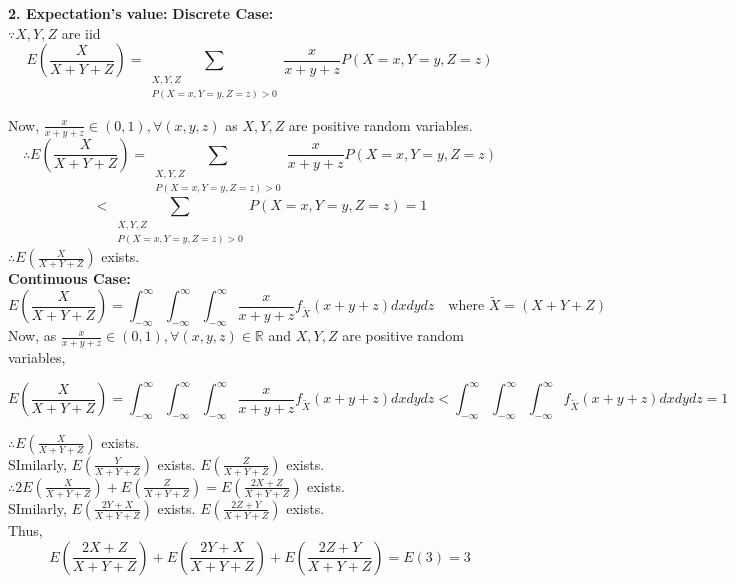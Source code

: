 \documentclass{article}
\theoremstyle{definition}
\begin{document}
\textbf{2. Expectation's value:}
\textbf{Discrete Case:\\
$\because X,Y,Z$}  are iid
\[
E\left( \frac{X}{X + Y + Z} \right) = \sum_{\substack{X,Y,Z \\ P(X=x, Y=y, Z=z)>0}} \frac{x}{x + y + z} P(X=x, Y=y, Z=z)

\]


Now, $\frac{x}{x + y + z} \in (0,1), \forall (x,y,z)$  as $X,Y, Z$ are positive random variables.
\[
\therefore E\left( \frac{X}{X + Y + Z} \right) = \sum_{\substack{X,Y,Z \\ P(X=x, Y=y, Z=z)>0}} \frac{x}{x + y + z} P(X=x, Y=y, Z=z)
\]
\[
< \sum_{\substack{X,Y,Z \\ P(X=x, Y=y, Z=z)>0}}  P(X=x, Y=y, Z=z) = \boxed{1}
\]
$\therefore E\left( \frac{X}{X + Y + Z} \right) $ exists.\\

\textbf{Continuous Case:}\\
\[
E\left( \frac{X}{X + Y + Z} \right) = \int_{-\infty}^{\infty}\int_{-\infty}^{\infty}\int_{-\infty}^{\infty} \frac{x}{x + y + z} f_{\tilde{X}} (x + y + z) dx dy dz \quad \text{where $\tilde{X} = (X + Y + Z)$ } 
\]
Now, as $\frac{x}{x + y + z} \in (0,1), \forall (x,y,z) \in \mathbb R$ and   $X,Y, Z$ are positive random variables,

\[
E\left( \frac{X}{X + Y + Z} \right) = \int_{-\infty}^{\infty}\int_{-\infty}^{\infty}\int_{-\infty}^{\infty} \frac{x}{x + y + z} f_{\tilde{X}} (x + y + z) dx dy dz < \int_{-\infty}^{\infty}\int_{-\infty}^{\infty}\int_{-\infty}^{\infty} f_{\tilde{X}} (x + y + z) dx dy dz = \boxed{1}
\]

$\therefore E\left( \frac{X}{X + Y + Z} \right) $ exists.\\

SImilarly,  $ E\left( \frac{Y}{X + Y + Z} \right) $ exists. $ E\left( \frac{Z}{X + Y + Z} \right) $ exists.\\

$\therefore 2 E\left( \frac{X}{X + Y + Z} \right) + E\left( \frac{Z}{X + Y + Z} \right) = E\left( \frac{2X + Z}{X + Y + Z} \right)  $ exists.\\

SImilarly,  $ E\left( \frac{2Y + X}{X + Y + Z} \right) $ exists. $ E\left( \frac{2Z + Y}{X + Y + Z} \right) $ exists.\\

Thus, 
\[
E\left( \frac{2X + Z}{X + Y + Z} \right) + E\left( \frac{2Y + X}{X + Y + Z} \right) + E\left( \frac{2Z + Y}{X + Y + Z} \right) = E(3) = \boxed{3}
\]
\end{document}
